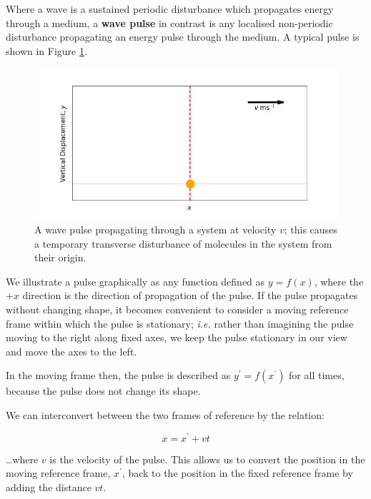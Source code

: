 \documentclass[
]{book}
\begin{document}
Where a wave is a sustained periodic disturbance which propagates energy through a medium, a \textbf{wave pulse} in contrast is any localised non-periodic disturbance propagating an energy pulse through the medium. A typical pulse is shown in Figure \ref{fig:ch6-wavepulse1}.

\begin{figure}

{\centering \includegraphics[width=0.7\linewidth]{visualisations/ch6-wavepulse1} 

}

\caption{A wave pulse propagating through a system at velocity $v$; this causes a temporary transverse disturbance of molecules in the system from their origin.}\label{fig:ch6-wavepulse1}
\end{figure}

We illustrate a pulse graphically as any function defined as \(y = f(x)\), where the \(+x\) direction is the direction of propagation of the pulse. If the pulse propagates without changing shape, it becomes convenient to consider a moving reference frame within which the pulse is stationary; \emph{i.e.} rather than imagining the pulse moving to the right along fixed axes, we keep the pulse stationary in our view and move the axes to the left.

In the moving frame then, the pulse is described as \(y^\prime = f(x^\prime)\) for all times, because the pulse does not change its shape.

We can interconvert between the two frames of reference by the relation:

\begin{equation}
x = x^\prime + vt
\label{eq:ch6-refframeconvert1}
\end{equation}

\ldots where \(v\) is the velocity of the pulse. This allows us to convert the position in the moving reference frame, \(x^\prime\), back to the position in the fixed reference frame by adding the distance \(vt\).
\end{document}
